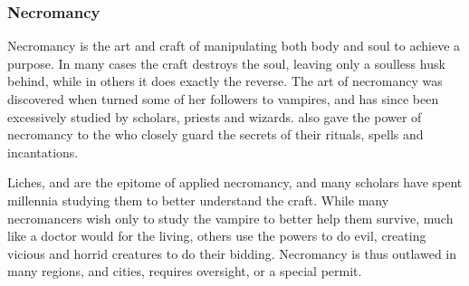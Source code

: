 \subsubsection{Necromancy}
\label{sec:Necromancy}

Necromancy is the art and craft of manipulating both body and soul to achieve
a purpose. In many cases the craft destroys the soul, leaving only a soulless
husk behind, while in others it does exactly the reverse. The art of
necromancy was discovered when  turned some of her
followers to vampires, and has since been excessively studied by scholars,
priests and wizards.  also gave the power of necromancy to
the  who closely guard the secrets of their rituals, spells
and incantations.

Liches, and  are the epitome of applied necromancy, and
many scholars have spent millennia studying them to better understand the
craft. While many necromancers wish only to study the vampire to better help
them survive, much like a doctor would for the living, others use the powers to
do evil, creating vicious and horrid creatures to do their bidding. Necromancy
is thus outlawed in many regions, and cities, requires oversight, or a special
permit.